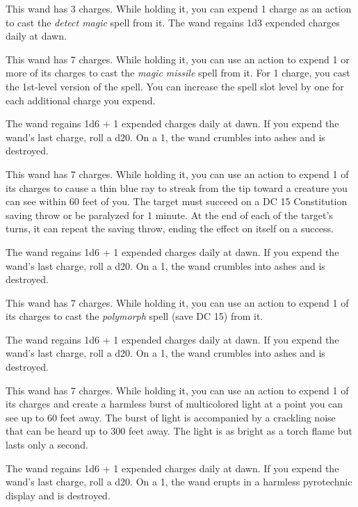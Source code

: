 \documentclass[10pt,a4paper,twoside,bg=print,twocolumn,openany,nodeprecatedcode]{dndbook}
\begin{document}
This wand has 3 charges. While holding it, you can expend 1 charge as an action to cast the \textit{detect magic} spell from it. The wand regains 1d3 expended charges daily at dawn.

This wand has 7 charges. While holding it, you can use an action to expend 1 or more of its charges to cast the \textit{magic missile} spell from it. For 1 charge, you cast the 1st-level version of the spell. You can increase the spell slot level by one for each additional charge you expend.

The wand regains 1d6 + 1 expended charges daily at dawn. If you expend the wand's last charge, roll a d20. On a 1, the wand crumbles into ashes and is destroyed.

This wand has 7 charges. While holding it, you can use an action to expend 1 of its charges to cause a thin blue ray to streak from the tip toward a creature you can see within 60 feet of you. The target must succeed on a DC 15 Constitution saving throw or be paralyzed for 1 minute. At the end of each of the target's turns, it can repeat the saving throw, ending the effect on itself on a success.

The wand regains 1d6 + 1 expended charges daily at dawn. If you expend the wand's last charge, roll a d20. On a 1, the wand crumbles into ashes and is destroyed.

This wand has 7 charges. While holding it, you can use an action to expend 1 of its charges to cast the \textit{polymorph} spell (save DC 15) from it.

The wand regains 1d6 + 1 expended charges daily at dawn. If you expend the wand's last charge, roll a d20. On a 1, the wand crumbles into ashes and is destroyed.

This wand has 7 charges. While holding it, you can use an action to expend 1 of its charges and create a harmless burst of multicolored light at a point you can see up to 60 feet away. The burst of light is accompanied by a crackling noise that can be heard up to 300 feet away. The light is as bright as a torch flame but lasts only a second.

The wand regains 1d6 + 1 expended charges daily at dawn. If you expend the wand's last charge, roll a d20. On a 1, the wand erupts in a harmless pyrotechnic display and is destroyed.
\end{document}
